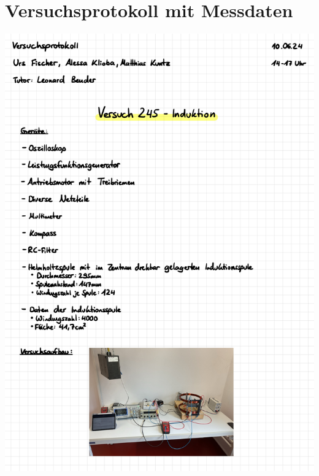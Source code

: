 \documentclass{article}
\begin{document}
\phantom{.}





\newpage

\section{Versuchsprotokoll mit Messdaten}

\includegraphics[width=\textwidth]{graphics/mess1.jpg}
\newpage
\end{document}
